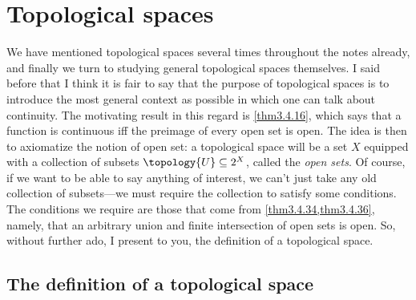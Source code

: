 \chapter{Topological spaces}\label{chp3}

We have mentioned topological spaces several times throughout the notes already, and finally we turn to studying general topological spaces themselves.  I said before that I think it is fair to say that the purpose of topological spaces is to introduce the most general context as possible in which one can talk about continuity.  The motivating result in this regard is \cref{thm3.4.16}, which says that a function is continuous iff the preimage of every open set is open.  The idea is then to axiomatize the notion of open set:  a topological space will be a set $X$ equipped with a collection of subsets $\topology{U}\subseteq 2^X$, called the \emph{open sets}.  Of course, if we want to be able to say anything of interest, we can't just take any old collection of subsets---we must require the collection to satisfy some conditions.  The conditions we require are those that come from \cref{thm3.4.34,thm3.4.36}, namely, that an arbitrary union and finite intersection of open sets is open.  So, without further ado, I present to you, the definition of a topological space.

\section{The definition of a topological space}

